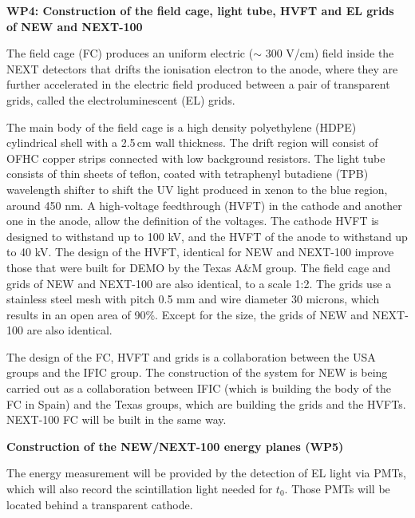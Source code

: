 {\bf WP4: Construction of the field cage, light tube, HVFT and EL grids of NEW and NEXT-100}

The field cage (FC) produces an uniform electric ($\sim$ 300 V/cm) field inside the NEXT detectors that drifts the ionisation electron to the anode, where they are further accelerated in the electric field produced between a pair of transparent grids, called the electroluminescent (EL) grids. 

The main body of the field cage is a high density polyethylene (HDPE) cylindrical shell with a 2.5\,cm wall thickness.  The drift region will consist of OFHC copper strips connected with low background resistors.  The light tube consists of thin sheets of teflon, coated with tetraphenyl butadiene (TPB) wavelength shifter to shift the UV light produced in xenon to the blue region, around 450 nm.  A high-voltage feedthrough (HVFT) in the cathode and another one in the anode, allow the definition of the voltages. The cathode HVFT is designed to withstand up to 100 kV, and the HVFT of the anode to withstand up to 40 kV. The design of the HVFT, identical for NEW and NEXT-100 improve those that were built for DEMO by the Texas A\&M group. The field cage and grids of NEW and NEXT-100 are also identical, to a scale 1:2. The grids use a stainless steel mesh with pitch 0.5 mm and wire diameter 30 microns, which results in an open area of 90\%. Except for the size, the grids of NEW and NEXT-100 are also identical.   

The design of the FC, HVFT and grids is a collaboration between the USA groups and the IFIC group. The construction of the system for NEW is being carried out as a collaboration between IFIC (which is building the body of the FC in Spain) and the Texas groups, which are building the grids and the HVFTs. NEXT-100 FC will be built in the same way. 

{\bf Construction of the NEW/NEXT-100 energy planes (WP5)}

The energy measurement will be provided by the detection of EL light via PMTs, which will also record the scintillation light needed for $t_0$. Those PMTs will be located behind a transparent cathode.


